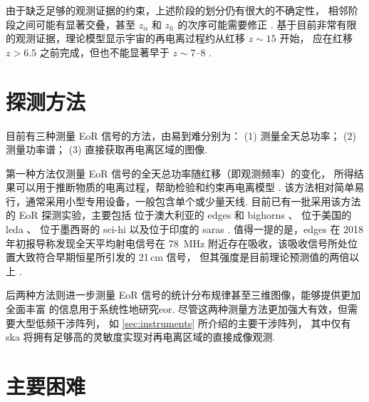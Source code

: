 由于缺乏足够的观测证据的约束，上述阶段的划分仍有很大的不确定性，
相邻阶段之间可能有显著交叠，甚至 $z_{\alpha}$ 和 $z_h$ 的次序可能需要修正
\cite{nusser2005,pritchard2012}.
基于目前非常有限的观测证据，理论模型显示宇宙的再电离过程约从红移 $z \sim 15$ 开始，
应在红移 $z > 6.5$ 之前完成，但也不能显著早于 $z \sim \numrange{7}{8}$
\cite{choudhury2006,pritchard2010mn}.


\section{探测方法}
\label{sec:det-methods}

目前有三种测量 EoR 信号的方法，由易到难分别为：
(1) 测量全天总功率；
(2) 测量功率谱；
(3) 直接获取再电离区域的图像.

第一种方法仅测量 EoR 信号的全天总功率随红移（即观测频率）的变化，
所得结果可以用于推断物质的电离过程，帮助检验和约束再电离模型
\cite{pritchard2012,liu2016}.
该方法相对简单易行，通常采用小型专用设备，一般包含单个或少量天线.
目前已有一批采用该方法的 EoR 探测实验，主要包括
位于澳大利亚的 \ac{edges} \cite{bowman2008} 和
\ac{bighorns} \cite{sokolowski2015}、
位于美国的 \ac{leda} \cite{greenhill2012}、
位于墨西哥的 \ac{sci-hi} \cite{voytek2014}
以及位于印度的 \ac{saras} \cite{singh2018}.
值得一提的是，\acs{edges} 在 2018 年初报导称发现全天平均射电信号在 \SI{78}{\MHz}
附近存在吸收，该吸收信号所处位置大致符合早期恒星所引发的 21\,cm 信号，
但其强度是目前理论预测值的两倍以上 \cite{bowman2018}.

后两种方法则进一步测量 EoR 信号的统计分布规律甚至三维图像，能够提供更加全面丰富
的信息用于系统性地研究\acl{eor}.
尽管这两种测量方法更加强大有效，但需要大型低频干涉阵列，
如 \autoref{sec:instruments} 所介绍的主要干涉阵列，
其中仅有 \acs{ska} 将拥有足够高的灵敏度实现对再电离区域的直接成像观测.


\section{主要困难}
\label{sec:det-difficulties}

